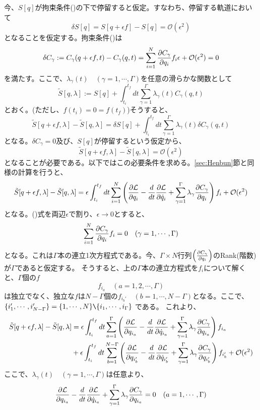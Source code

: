 \documentclass[a4paper,11pt]{ltjsarticle}
\newcommand{\La}{\mathcal{L}}
\newcommand{\intS}{\int_{t_i}^{t_f}dt}
\begin{document}
今、$S[q]$が拘束条件()の下で停留すると仮定。すなわち、停留する軌道において
\[
\delta S[q]=S[q+\epsilon f]-S[q]=\mathcal{O}(\epsilon^2)
\]
となることを仮定する。拘束条件()は
\begin{equation}
\delta C_\gamma:=C_\gamma(q+\epsilon f,t)-C_\gamma(q,t)=\sum_{i=1}^{N}\pdv{C_\gamma}{q_i}f_i\epsilon+\mathcal{O}(\epsilon^2)=0
\label{eq:Kousoku}
\end{equation}
を満たす。ここで、$\lambda_\gamma(t)\quad(\gamma=1,\cdots,\Gamma)$を任意の滑らかな関数として
\[
\tilde{S}[q,\lambda]:=S[q]+\intS\sum_{\gamma=1}^{\Gamma}\lambda_\gamma(t) C_\gamma(q,t)
\]
とおく。(ただし、$f(t_i)=0=f(t_f)$)そうすると、
\[
\tilde{S}[q+\epsilon f,\lambda]-\tilde{S}[q,\lambda]=\delta S[q]+\intS\sum_{\gamma=1}^{\Gamma}\lambda_\gamma(t)\delta C_\gamma(q,t)
\]
となる。$\delta C_\gamma=0$及び、$S[q]$が停留するという仮定から、
\[
\tilde{S}[q+\epsilon f,\lambda]-\tilde{S}[q,\lambda]=\mathcal{O}(\epsilon^2)
\]
となることが必要である。以下ではこの必要条件を求める。\ref{sec:Henbun}節と同様の計算を行うと、
\[
\tilde{S}[q+\epsilon f,\lambda]-\tilde{S}[q,\lambda]=\epsilon\intS\sum_{i=1}^{N}\left(\pdv{\La}{q_i}-\frac{d}{dt}\pdv{\La}{\dot{q}_i}+\sum_{\gamma=1}^{\Gamma}\lambda_\gamma\pdv{C_\gamma}{q_i}\right)f_i+\mathcal{O}(\epsilon^2)
\]
となる。()式を両辺$\epsilon$で割り、$\epsilon\rightarrow0$とすると、
\[
\sum_{i=1}^{N}\pdv{C_\gamma}{q_i}f_i=0 \quad (\gamma=1,\cdots,\Gamma)
\]
となる。これは$\Gamma$本の連立1次方程式である。今、$\Gamma\times N$行列$\left(\pdv{C_\gamma}{q_i}\right)$のRank(階数)が$\Gamma$であると仮定する。
そうすると、上の$\Gamma$本の連立方程式を$f_i$について解くと、$\Gamma$個の$f$
\[
f_{i_a} \quad (a=1,2,\cdots,\Gamma)
\]
は独立でなく、独立な$f$は$N-\Gamma$個の$f_{i_b'} \quad (b=1,\cdots,N-\Gamma)$となる。ここで、$\{ i_1',\cdots,i_{N-\Gamma}'\} = \{ 1,\cdots,N \} \verb|\| \{ i_1,\cdots,i_\Gamma \}$ である。
これより、
\begin{align*}
\tilde{S}[q+\epsilon f,\lambda]-\tilde{S}[q,\lambda]&=\epsilon\intS\sum_{a=1}^{\Gamma}\left(\pdv{\La}{q_{i_a}}-\frac{d}{dt}\pdv{\La}{\dot{q}_{i_a}}+\sum_{\gamma=1}^{\Gamma}\lambda_\gamma\pdv{C_\gamma}{q_{i_a}}\right)f_{i_a}
\\&+\epsilon\intS\sum_{b=1}^{N-\Gamma}\left(\pdv{\La}{q_{i_b'}}-\frac{d}{dt}\pdv{\La}{\dot{q}_{i_b'}}+\sum_{\gamma=1}^{\Gamma}\lambda_\gamma\pdv{C_\gamma}{q_{i_b'}}\right)f_{i_b'}+\mathcal{O}(\epsilon^2)
\end{align*}
ここで、$\lambda_\gamma(t) \quad (\gamma=1,\cdots,\Gamma)$は任意より、
\[
\pdv{\La}{q_{i_a}}-\frac{d}{dt}\pdv{\La}{\dot{q}_{i_a}}+\sum_{\gamma=1}^{\Gamma}\lambda_\gamma\pdv{C_\gamma}{q_{i_a}}=0 \quad (a=1,\cdots,\Gamma)
\]
\end{document}
